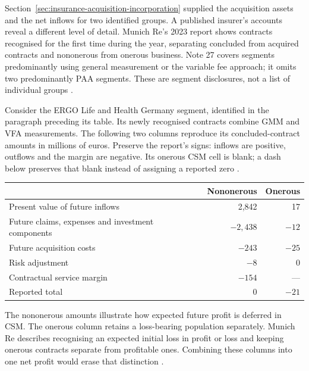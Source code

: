 Section~\ref{sec:insurance-acquisition-incorporation} supplied the acquisition assets and the net inflows
for two identified groups. A published insurer's accounts reveal a different
level of detail. Munich Re's 2023 report shows contracts recognised for the
first time during the year, separating concluded from acquired contracts and
nononerous from onerous business. Note 27 covers segments predominantly using
general measurement or the variable fee approach; it omits two predominantly
PAA segments. These are segment disclosures, not a list of individual groups
\citep[printed pp. 252--254]{munichre2023annual}.

Consider the ERGO Life and Health Germany segment, identified in the paragraph
preceding its table. Its newly recognised contracts combine GMM and VFA
measurements. The following two columns reproduce its concluded-contract
amounts in millions of euros. Preserve the report's signs: inflows are positive,
outflows and the margin are negative. Its onerous CSM cell is blank; a dash
below preserves that blank instead of assigning a reported zero
\citep[printed pp. 252--253]{munichre2023annual}.

\begin{center}
\begin{tabular}{p{}rr}
\toprule
 & Nononerous & Onerous \\
\midrule
Present value of future inflows & 2,842 & 17 \\
Future claims, expenses and investment components & $-2,438$ & $-12$ \\
Future acquisition costs & $-243$ & $-25$ \\
Risk adjustment & $-8$ & 0 \\
Contractual service margin & $-154$ & --- \\
Reported total & 0 & $-21$ \\
\bottomrule
\end{tabular}
\end{center}

The nononerous amounts illustrate how expected future profit is deferred in
CSM. The onerous column retains a loss-bearing population separately. Munich
Re describes recognising an expected initial loss in profit or loss and
keeping onerous contracts separate from profitable ones. Combining these
columns into one net profit would erase that distinction
\citep[printed pp. 165--166]{munichre2023annual}.

